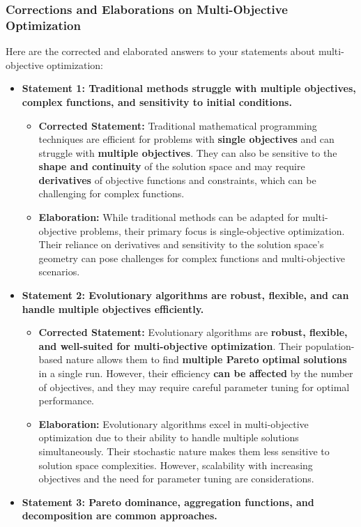 \documentclass[
]{article}
\author{}
\date{}
\begin{document}
\subsubsection{Corrections and Elaborations on Multi-Objective
Optimization}\label{corrections-and-elaborations-on-multi-objective-optimization}

Here are the corrected and elaborated answers to your statements about
multi-objective optimization:

\begin{itemize}
\item
  \textbf{Statement 1: Traditional methods struggle with multiple
  objectives, complex functions, and sensitivity to initial conditions.}

  \begin{itemize}
  
  \item
    \textbf{Corrected Statement:} Traditional mathematical programming
    techniques are efficient for problems with \textbf{single
    objectives} and can struggle with \textbf{multiple objectives}. They
    can also be sensitive to the \textbf{shape and continuity} of the
    solution space and may require \textbf{derivatives} of objective
    functions and constraints, which can be challenging for complex
    functions.
  \item
    \textbf{Elaboration:} While traditional methods can be adapted for
    multi-objective problems, their primary focus is single-objective
    optimization. Their reliance on derivatives and sensitivity to the
    solution space's geometry can pose challenges for complex functions
    and multi-objective scenarios.
  \end{itemize}
\item
  \textbf{Statement 2: Evolutionary algorithms are robust, flexible, and
  can handle multiple objectives efficiently.}

  \begin{itemize}
  
  \item
    \textbf{Corrected Statement:} Evolutionary algorithms are
    \textbf{robust, flexible, and well-suited for multi-objective
    optimization}. Their population-based nature allows them to find
    \textbf{multiple Pareto optimal solutions} in a single run. However,
    their efficiency \textbf{can be affected} by the number of
    objectives, and they may require careful parameter tuning for
    optimal performance.
  \item
    \textbf{Elaboration:} Evolutionary algorithms excel in
    multi-objective optimization due to their ability to handle multiple
    solutions simultaneously. Their stochastic nature makes them less
    sensitive to solution space complexities. However, scalability with
    increasing objectives and the need for parameter tuning are
    considerations.
  \end{itemize}
\item
  \textbf{Statement 3: Pareto dominance, aggregation functions, and
  decomposition are common approaches.}


\end{itemize}
\end{document}

